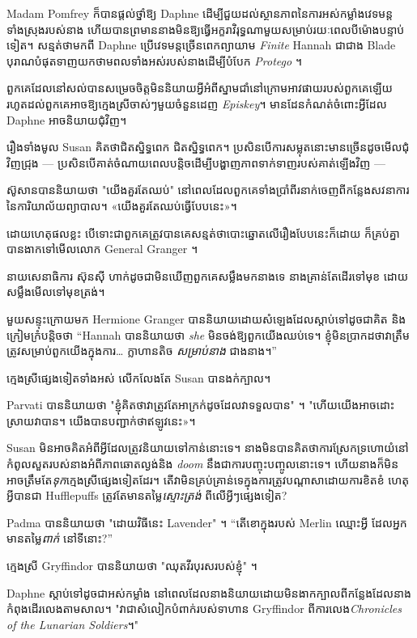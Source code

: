 {{{Madam Pomfrey ក៏បានផ្តល់ថ្នាំឱ្យ Daphne ដើម្បីជួយដល់ស្ថានភាពនៃការអស់កម្លាំងវេទមន្តទាំងស្រុងរបស់នាង ហើយបានព្រមាននាងមិនឱ្យធ្វើអក្ខរាវិរុទ្ធណាមួយសម្រាប់រយៈពេលបីម៉ោងបន្ទាប់ទៀត។ សន្មត់ថាមកពី Daphne ប្រើវេទមន្តច្រើនពេកព្យាយាម \emph{Finite} Hannah ជាជាង Blade បុរាណបំផុតទាញយកថាមពលទាំងអស់របស់នាងដើម្បីបំបែក \emph{Protego} ។

ពួកគេដែលនៅសល់បានសម្រេចចិត្តមិននិយាយអ្វីអំពីស្នាមជាំនៅក្រោមអាវផាយរបស់ពួកគេឡើយ រហូតដល់ពួកគេអាចឱ្យក្មេងស្រីចាស់ៗមួយចំនួនដេញ \emph{Episkey}។ មានដែនកំណត់ចំពោះអ្វីដែល Daphne អាចនិយាយជុំវិញ។

រឿងទាំងមូល Susan គិតថាជិតស្និទ្ធពេក ជិតស្និទ្ធពេក។ ប្រសិនបើការសម្លុតនោះមានច្រើនដូចមើលជុំវិញជ្រុង — ប្រសិនបើគាត់ចំណាយពេលបន្តិចដើម្បីបង្ហាញភាពទាក់ទាញរបស់គាត់ឡើងវិញ —

ស៊ូសានបាននិយាយថា "យើងគួរតែឈប់" នៅពេលដែលពួកគេទាំងប្រាំពីរនាក់ចេញពីកន្លែងសវនាការនៃការិយាល័យព្យាបាល។ «យើង​គួរ​តែ​ឈប់​ធ្វើ​បែប​នេះ»។

ដោយហេតុផលខ្លះ បើទោះជាពួកគេត្រូវបានគេសន្មត់ថាបោះឆ្នោតលើរឿងបែបនេះក៏ដោយ ក៏គ្រប់គ្នាបានងាកទៅមើលលោក General Granger ។

នាយសេនាធិការ ស៊ុនស៊ី ហាក់ដូចជាមិនឃើញពួកគេសម្លឹងមកនាងទេ នាងគ្រាន់តែដើរទៅមុខ ដោយសម្លឹងមើលទៅមុខត្រង់។

មួយសន្ទុះក្រោយមក Hermione Granger បាននិយាយដោយសំឡេងដែលស្តាប់ទៅដូចជាគិត និងក្រៀមក្រំបន្តិចថា “Hannah បាននិយាយថា \emph{she} មិនចង់ឱ្យពួកយើងឈប់ទេ។ ខ្ញុំ​មិន​ប្រាកដ​ថា​វា​ត្រឹម​ត្រូវ​សម្រាប់​ពួក​យើង​ក្នុង​ការ… ក្លាហាន​តិច \emph{សម្រាប់​នាង} ជាង​នាង។”

ក្មេងស្រីផ្សេងទៀតទាំងអស់ លើកលែងតែ Susan បានងក់ក្បាល។

Parvati បាននិយាយថា "ខ្ញុំគិតថាវាត្រូវតែអាក្រក់ដូចដែលវាទទួលបាន" ។ "ហើយយើងអាចដោះស្រាយវាបាន។ យើង​បាន​បញ្ជាក់​ថា​ឥឡូវ​នេះ»។

Susan មិន​អាច​គិត​អំពី​អ្វី​ដែល​ត្រូវ​និយាយ​ទៅ​កាន់​នោះ​ទេ។ នាង​មិន​បាន​គិត​ថា​ការ​ស្រែក​ទ្រហោយំ​នៅ​កំពូល​សួត​របស់​នាង​អំពី​ភាព​ឆោត​ល្ងង់​និង \emph{doom} នឹង​ជា​ការ​បញ្ចុះបញ្ចូល​នោះ​ទេ។ ហើយនាងក៏មិនអាចត្រឹមតែ\emph{ទុក}ក្មេងស្រីផ្សេងទៀតដែរ។ តើវាមិនគ្រប់គ្រាន់ទេក្នុងការត្រូវបណ្តាសាដោយការខិតខំ ហេតុអ្វីបានជា Hufflepuffs ត្រូវតែមានតម្លៃ\emph{ស្មោះត្រង់} ពីលើអ្វីៗផ្សេងទៀត?

Padma បាននិយាយថា "ដោយវិធីនេះ Lavender" ។ “តើខោក្នុងរបស់ Merlin ឈ្មោះអ្វី ដែលអ្នកមានតម្លៃ\emph{ពាក់} នៅទីនោះ?”

ក្មេងស្រី Gryffindor បាននិយាយថា "ឈុតវីរបុរសរបស់ខ្ញុំ" ។

Daphne ស្តាប់ទៅដូចជាអស់កម្លាំង នៅពេលដែលនាងនិយាយដោយមិនងាកក្បាលពីកន្លែងដែលនាងកំពុងដើរលេងតាមសាល។ "វាជាសំលៀកបំពាក់របស់ទាហាន Gryffindor ពីការលេង\emph{Chronicles of the Lunarian Soldiers}។"

}}}
